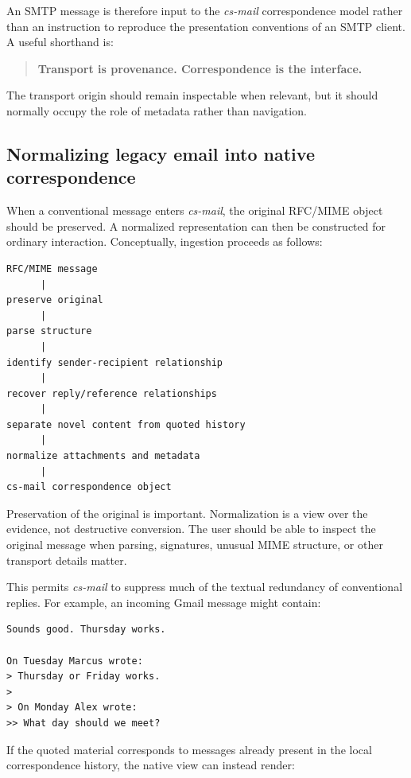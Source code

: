 \documentclass[11pt]{article}
\newcommand{\csmail}{\textit{cs-mail}}
\begin{document}
An SMTP message is therefore input to the \csmail{} correspondence model rather than an instruction to reproduce the presentation conventions of an SMTP client. A useful shorthand is:

\begin{quote}
\textbf{Transport is provenance. Correspondence is the interface.}
\end{quote}

The transport origin should remain inspectable when relevant, but it should normally occupy the role of metadata rather than navigation.

\subsection*{Normalizing legacy email into native correspondence}

When a conventional message enters \csmail{}, the original RFC/MIME object should be preserved. A normalized representation can then be constructed for ordinary interaction. Conceptually, ingestion proceeds as follows:

\begin{Verbatim}[fontsize=\small]
RFC/MIME message
      |
preserve original
      |
parse structure
      |
identify sender-recipient relationship
      |
recover reply/reference relationships
      |
separate novel content from quoted history
      |
normalize attachments and metadata
      |
cs-mail correspondence object
\end{Verbatim}

Preservation of the original is important. Normalization is a view over the evidence, not destructive conversion. The user should be able to inspect the original message when parsing, signatures, unusual MIME structure, or other transport details matter.

This permits \csmail{} to suppress much of the textual redundancy of conventional replies. For example, an incoming Gmail message might contain:

\begin{Verbatim}[fontsize=\small]
Sounds good. Thursday works.

On Tuesday Marcus wrote:
> Thursday or Friday works.
>
> On Monday Alex wrote:
>> What day should we meet?
\end{Verbatim}

If the quoted material corresponds to messages already present in the local correspondence history, the native view can instead render:
\end{document}
